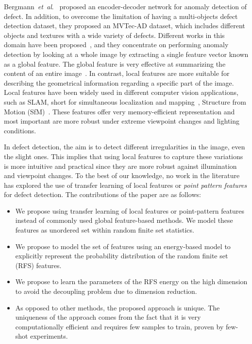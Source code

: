 \documentclass[journal]{IEEEtran}
\begin{document}
Bergmann~\textit{et~al}.~\cite{bergmann2019mvtec} proposed an encoder-decoder network for anomaly detection of defect.  In addition, to overcome the limitation of having a multi-objects defect detection dataset, they proposed an MVTec-AD dataset, which includes different objects and textures with a wide variety of defects. Different works in this domain have been proposed~\cite{bergmann2019mvtec,rudolph2021same}, and they concentrate on performing anomaly detection by looking at a whole image by extracting a single feature vector known as a global feature.  The global feature is very effective at summarizing the content of an entire image~\cite{cao2020unifying}. In contrast, local features are more suitable for describing the geometrical information regarding a specific part of the image. Local features have been widely used in different computer vision applications, such as SLAM, short for simultaneous localization and mapping~\cite{tang2019gcnv2}, Structure from Motion (SfM)~\cite{schonberger2018semantic}. These features offer very memory-efficient representation  and most important are more robust under extreme viewpoint changes and lighting conditions.

In defect detection, the aim is to detect different irregularities in the image, even the slight ones. This implies that using local features to capture these variations is more intuitive and practical since they are more robust against illumination and viewpoint changes. To the best of our knowledge, no work in the literature has explored the use of transfer learning of local features or \textit {point pattern features} for defect detection. The contributions of the paper are as follows: 
\begin{itemize}
	\item We propose using transfer learning of local features or point-pattern features instead of commonly used global feature-based methods. We model these features as unordered set within random finite set statistics.
	\item We propose to model the set of features using an energy-based model to explicitly represent the probability distribution of the random finite set (RFS) features.
	\item We propose to learn the parameters of the RFS energy on the high dimension to avoid the decoupling problem due to dimension reduction.
	\item As opposed to other methods, the proposed approach is unique. The uniqueness of the approach comes from the fact that it is very computationally efficient and requires few samples to train, proven by few-shot experiments.	
\end{itemize}
\end{document}
